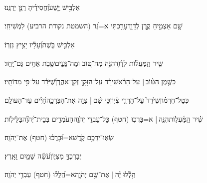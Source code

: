 \documentclass[12pt]{article}
\newcommand{\loc}[1]{\textsuperscript{\locf{#1}}}
\begin{document}
{\loc{ טז}~}‏ אַלְבִּ֣ישׁ יֶ֑שַׁע{\hfill}וַ֝חֲסִידֶ֗יהָ רַנֵּ֥ן יְרַנֵּֽנוּ׃\par

{\loc{ יז}~}‏שָׁ֤ם אַצְמִ֣יחַ קֶ֣רֶן לְדָוִ֑ד{\hfill}עָרַ֥כְתִּי א=נֵ֝ר (השמטת נקודת הרביע) לִמְשִׁיחִֽי׃\par

{\loc{ יח}~}‏ אַלְבִּ֣ישׁ בֹּ֑שֶׁת{\hfill}וְ֝עָלָ֗יו יָצִ֥יץ נִזְרֽוֹ׃\par\pend
\ledpb
\pstart[\subsection*{\textcolor{red}{פרק קלג}}]\label{פרק קלג}
{\loc{ א}~}‏שִׁ֥יר הַֽמַּעֲל֗וֹת לְדָ֫וִ֥ד\newline\hspace*{.5em}הִנֵּ֣ה מַה־טּ֭וֹב וּמַה־נָּעִ֑ים{\hfill}שֶׁ֖בֶת אַחִ֣ים גַּם־יָֽחַד׃\par

{\loc{ ב}~}‏כַּשֶּׁ֤מֶן הַטּ֨וֹב | {\hfill}עַל־הָרֹ֗אשׁ\newline\hspace*{.5em}יֹרֵ֗ד עַֽל־הַזָּקָ֥ן זְקַֽן־אַהֲרֹ֑ן{\hfill}שֶׁ֝יֹּרֵ֗ד עַל־פִּ֥י מִדּוֹתָֽיו׃\par

{\loc{ ג}~}‏כְּטַל־חֶרְמ֗וֹן{\hfill}שֶׁיֹּרֵד֮ עַל־הַרְרֵ֢י צִ֫יּ֥וֹן\newline\hspace*{.5em}כִּ֤י שָׁ֨ם |  צִוָּ֣ה  אֶת־הַבְּרָכָ֑ה{\hfill}חַ֝יִּ֗ים עַד־הָעוֹלָֽם׃\par\pend

\pstart[\subsection*{\textcolor{red}{פרק קלד}}]\label{פרק קלד}
{\loc{ א}~}‏שִׁ֗יר הַֽמַּ֫עֲל֥וֹת\newline\hspace*{.5em}הִנֵּ֤ה |  א=בָּרֲכ֣וּ (חטף) {\hfill}כׇּל־עַבְדֵ֣י יְהֹוָ֑ה\newline\hspace*{.5em}הָעֹמְדִ֥ים בְּבֵית־יְ֝הֹוָ֗ה{\hfill}בַּלֵּילֽוֹת׃\par

{\loc{ ב}~}‏שְׂאֽוּ־יְדֵכֶ֥ם קֹ֑דֶשׁ{\hfill}א=וּ֝בָרֲכ֗וּ (חטף) אֶת־יְהֹוָֽה׃\par

{\loc{ ג}~}‏יְבָרֶכְךָ֣  מִצִּיּ֑וֹן{\hfill}עֹ֝שֵׂ֗ה שָׁמַ֥יִם וָאָֽרֶץ׃\par\pend
\ledpb
\pstart[\subsection*{\textcolor{red}{פרק קלה}}]\label{פרק קלה}
{\loc{ א}~}‏הַ֥לְﬞלוּ יָ֨הּ | \newline\hspace*{.5em} אֶת־שֵׁ֣ם יְהֹוָ֑ה{\hfill}א=הַֽ֝לֲל֗וּ (חטף) עַבְדֵ֥י יְהֹוָֽה׃\par
\end{document}
